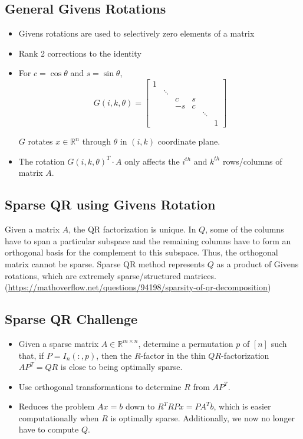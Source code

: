 \documentclass[a4paper]{article}
\newcommand{\R}{\mathbb{R}}
\begin{document}
\subsection{General Givens Rotations}
\begin{itemize}
\item Givens rotations are used to selectively zero elements of a matrix
\item Rank 2 corrections to the identity
\item For $c= \cos\theta$ and $s = \sin\theta$,
\[G(i,k, \theta) = \begin{bmatrix}
1 &          &    &   &      &   \\
  &  \ddots  &    &   &      &   \\
  &          & c  & s &      &   \\
  &          & -s & c &      &   \\
  &          &    &   &\ddots&   \\
  &          &    &   &      & 1 
\end{bmatrix}\] 

$G$ rotates $x\in \R^n$ through $\theta$ in $(i,k)$ coordinate plane.
\item The rotation $G(i,k,\theta)^{T} \cdot A$ only affects the $i^{th}$ and $k^{th}$ rows/columns of matrix $A$.
\end{itemize}

\subsection{Sparse QR using Givens Rotation}

Given a matrix $A$, the QR factorization is unique. In $Q$, some of the columns have to span a particular subspace and the remaining columns have to form an orthogonal basis for the complement to this subspace. Thus, the orthogonal matrix cannot be sparse. Sparse QR method represents $Q$ as a product of Givens rotations, which are extremely sparse/structured matrices.(\url{https://mathoverflow.net/questions/94198/sparsity-of-qr-decomposition})

\subsection{Sparse QR Challenge}

\begin{itemize}
\item Given a sparse matrix $A \in \mathbb{R}^{m \times n}$, determine a permutation $p$ of $[n]$ such that, if $P = I_n(:,p)$, then the $R$-factor in the thin $QR$-factorization $AP^{T} = QR$ is close to being optimally sparse.
\item Use orthogonal transformations to determine $R$ from $AP^{T}$.
\item Reduces the problem $Ax = b$ down to $R^{T}RPx = PA^{T}b$, which is easier computationally when $R$ is optimally sparse. Additionally, we now no longer have to compute $Q$.
\end{itemize}
\end{document}

